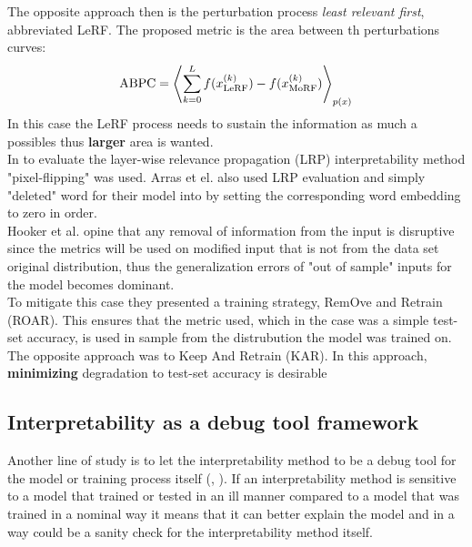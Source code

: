 \documentclass[12pt]{report}
\begin{document}
The opposite approach then is the perturbation process \textit{least relevant first}, abbreviated LeRF. The proposed metric is the area between th perturbations curves:
\begin{align*}
	\text{ABPC} = \Braket{	\sum_{k=0}^{L}f(x_{\text{LeRF}}^{(k)}) -f(x_{\text{MoRF}}^{(k)})}_{p(x)}
\end{align*}
In this case the LeRF process needs to sustain the information as much a possibles thus \textbf{larger} area is wanted.\\

In \cite{LRP} to evaluate the layer-wise relevance propagation (LRP) interpretability method "pixel-flipping" was used.  Arras et el. \cite{DBLP:journals/corr/ArrasHMMS16a} also used LRP evaluation and simply "deleted" word for their model into by setting the corresponding word embedding to zero in order. \\

Hooker et al.  \cite{https://doi.org/10.48550/arxiv.1806.10758} opine that any removal of information from the input is disruptive since the metrics will be used on modified input that is not from the data set original distribution, thus the generalization errors of "out of sample" inputs for the model becomes dominant. \\

To mitigate this case they presented a training strategy, RemOve and Retrain (ROAR). This ensures that the metric used, which in the case was a simple test-set accuracy, is used in sample from the distrubution the model was trained on. The opposite approach was to Keep And Retrain (KAR). In this approach, \textbf{minimizing} degradation to test-set accuracy is desirable\\

\newpage
\subsection{Interpretability as a debug tool framework}

Another line of study is to let the interpretability method to be a debug tool for the model or training process itself (\cite{https://doi.org/10.48550/arxiv.1810.03292}, \cite{DBLP:journals/corr/abs-2011-05429}). If an interpretability method is sensitive to a model that trained or tested in an ill manner compared to a model that was trained in a nominal way it means that it can better explain the model and in a way could be a sanity check for the interpretability method itself. \\
\end{document}
